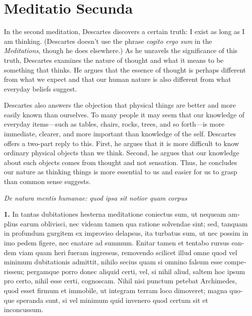 \chapter{Meditatio Secunda}


In the second meditation, Descartes discovers a certain truth: I exist as long as I am thinking. (Descartes doesn't use the phrase \textit{cogito ergo sum} in the \textit{Meditations}, though he does elsewhere.) As he unravels the significance of this truth, Descartes examines the nature of thought and what it means to be something that thinks. He argues that the essence of thought is perhaps different from what we expect and that our human nature is also different from what everyday beliefs suggest.

Descartes also answers the objection that physical things are better and more easily known than ourselves. To many people it may seem that our knowledge of everyday items---such as tables, chairs, rocks, trees, and so forth---is more immediate, clearer, and more important than knowledge of the self. Descartes offers a two-part reply to this. First, he argues that it is more difficult to know ordinary physical objects than we think. Second, he argues that our knowledge about such objects comes from thought and not sensation. Thus, he concludes our nature as thinking things is more essential to us and easier for us to grasp than common sense suggests.

\clearpage

\clearpage
\begin{center}
    \beginnumbering
    \numberlinefalse
    \pstart
    \textit{De natura mentis humanae: quod ipsa sit notior quam corpus}
    \pend
    \endnumbering
\end{center}

\beginnumbering
\pstart
\begin{latin}
    \textenglish{\textbf{1.}} In tantas dubitationes hesterna meditatione coniectus sum, ut nequeam amplius earum oblivisci, nec videam tamen qua ratione solvendae sint; sed, tanquam in profundum gurgitem ex improviso delapsus, ita turbatus sum, ut nec possim in imo pedem figere, nec enatare ad summum. Enitar tamen et tentabo rursus eandem viam quam heri fueram ingressus, removendo scilicet illud omne quod vel minimum dubitationis admittit, nihilo secius quam si omnino falsum esse comperissem; pergamque porro donec aliquid certi, vel, si nihil aliud, saltem hoc ipsum pro certo, nihil esse certi, cognoscam. Nihil nisi punctum petebat Archimedes, quod esset firmum et immobile, ut integram terram loco dimoveret; magna quoque speranda sunt, si vel minimum quid invenero quod certum sit et inconcussum.
\end{latin}
\pend
\endnumbering

